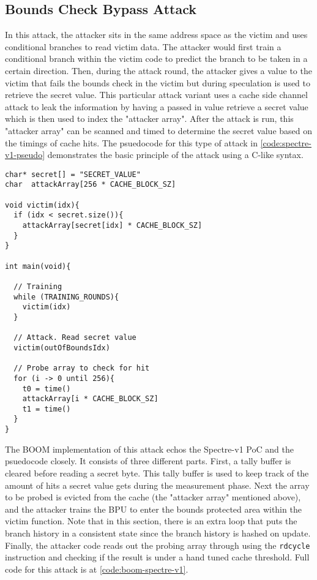 \subsection{Bounds Check Bypass Attack}

In this attack, the attacker sits in the same address space as the victim and uses
conditional branches to read victim data. The attacker would first train a conditional branch
within the victim code to predict the branch to be taken in a certain direction. Then,
during the attack round, the attacker
gives a value to the victim that fails the bounds check in the victim but during
speculation is used to retrieve the secret value. This particular attack variant
uses a cache side channel attack to leak the information by having a passed in value retrieve
a secret value which is then used to index the "attacker array". After the attack is run, this 
"attacker array" can be scanned and timed to determine the secret value based on the timings
of cache hits. The psuedocode for this type of attack in \ref{code:spectre-v1-pseudo}
demonstrates the basic principle of the attack using a C-like syntax.

\begin{lstlisting}[style=column-code, caption=Psuedocode of Bounds Check Bypass Attack]
char* secret[] = "SECRET_VALUE"
char  attackArray[256 * CACHE_BLOCK_SZ]

void victim(idx){
  if (idx < secret.size()){
    attackArray[secret[idx] * CACHE_BLOCK_SZ]
  }
}

int main(void){
  
  // Training
  while (TRAINING_ROUNDS){
    victim(idx)
  }

  // Attack. Read secret value
  victim(outOfBoundsIdx)

  // Probe array to check for hit
  for (i -> 0 until 256){
    t0 = time()
    attackArray[i * CACHE_BLOCK_SZ]
    t1 = time()
  }
}
\end{lstlisting}\label{code:spectre-v1-pseudo}


The BOOM implementation of this attack echos the Spectre-v1 PoC and the psuedocode closely.
It consists of three different parts. First, a tally buffer is cleared before reading a secret byte.
This tally buffer is used to keep track of the amount of hits a secret value gets during the measurement
phase. Next the array to be probed is evicted from the cache (the "attacker array" mentioned above), and
the attacker trains the BPU to enter the bounds protected area within the victim function. Note that in
this section, there is an extra loop that puts the branch history in a consistent state since the branch
history is hashed on update. Finally, the attacker code reads out the probing array through using the
{\tt rdcycle} instruction and checking if the result is under a hand tuned cache threshold. Full code for 
this attack is at \ref{code:boom-spectre-v1}.

